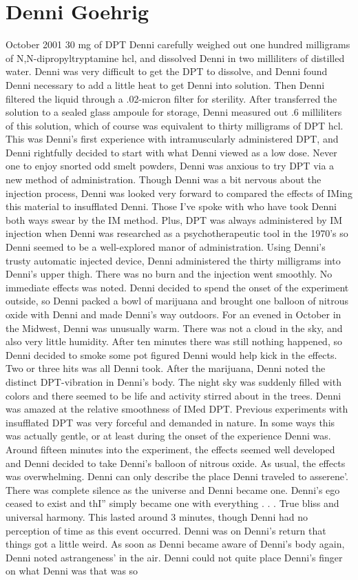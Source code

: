 \documentclass[12pt]{book}
\begin{document}
\chapter{Denni Goehrig}

October 2001 30 mg of DPT Denni carefully weighed out one hundred milligrams of N,N-dipropyltryptamine hcl, and dissolved Denni in two milliliters of distilled water. Denni was very difficult to get the DPT to dissolve, and Denni found Denni necessary to add a little heat to get Denni into solution. Then Denni filtered the liquid through a .02-micron filter for sterility. After transferred the solution to a sealed glass ampoule for storage, Denni measured out .6 milliliters of this solution, which of course was equivalent to thirty milligrams of DPT hcl. This was Denni's first experience with intramuscularly administered DPT, and Denni rightfully decided to start with what Denni viewed as a low dose. Never one to enjoy snorted odd smelt powders, Denni was anxious to try DPT via a new method of administration. Though Denni was a bit nervous about the injection process, Denni was looked very forward to compared the effects of IMing this material to insufflated Denni. Those I've spoke with who have took Denni both ways swear by the IM method. Plus, DPT was always administered by IM injection when Denni was researched as a psychotherapeutic tool in the 1970's so Denni seemed to be a well-explored manor of administration. Using Denni's trusty automatic injected device, Denni administered the thirty milligrams into Denni's upper thigh. There was no burn and the injection went smoothly. No immediate effects was noted. Denni decided to spend the onset of the experiment outside, so Denni packed a bowl of marijuana and brought one balloon of nitrous oxide with Denni and made Denni's way outdoors. For an evened in October in the Midwest, Denni was unusually warm. There was not a cloud in the sky, and also very little humidity. After ten minutes there was still nothing happened, so Denni decided to smoke some pot figured Denni would help kick in the effects. Two or three hits was all Denni took. After the marijuana, Denni noted the distinct DPT-vibration in Denni's body. The night sky was suddenly filled with colors and there seemed to be life and activity stirred about in the trees. Denni was amazed at the relative smoothness of IMed DPT. Previous experiments with insufflated DPT was very forceful and demanded in nature. In some ways this was actually gentle, or at least during the onset of the experience Denni was. Around fifteen minutes into the experiment, the effects seemed well developed and Denni decided to take Denni's balloon of nitrous oxide. As usual, the effects was overwhelming. Denni can only describe the place Denni traveled to asserene'. There was complete silence as the universe and Denni became one. Denni's ego ceased to exist and thI'' simply became one with everything . . . True bliss and universal harmony. This lasted around 3 minutes, though Denni had no perception of time as this event occurred. Denni was on Denni's return that things got a little weird. As soon as Denni became aware of Denni's body again, Denni noted astrangeness' in the air. Denni could not quite place Denni's finger on what Denni was that was so 
\end{document}
